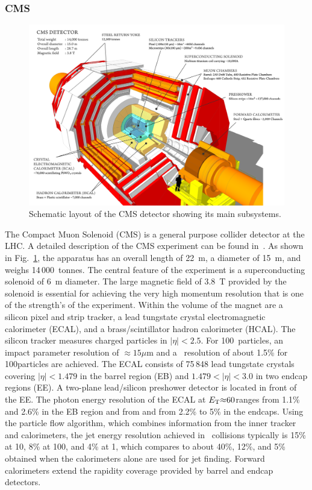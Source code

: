 \subsubsection{CMS}

\begin{figure}
\begin{center}
\includegraphics[height=0.49\textwidth]{introduction_figs/cms_120918_03.png}
\caption{Schematic layout of the CMS detector showing its main subsystems.}
\label{figs:CMSdet}
\end{center}
\end{figure}
The Compact Muon Solenoid (CMS) is a general purpose collider detector at the LHC. A detailed description of the CMS experiment
can be found in~\cite{Chatrchyan:2008zzk}.
As shown in Fig.~\ref{figs:CMSdet},  the apparatus has an overall length of 22~m, a diameter of 15~m, and weighs 14\,000~tonnes.
The central feature of the experiment is a superconducting solenoid
of 6~m diameter. The large magnetic field of 3.8~T provided by the solenoid is essential for achieving
the very high momentum resolution that is one of the strength's of the experiment.
Within the volume of the magnet are a silicon pixel and strip tracker, a lead tungstate crystal
electromagnetic calorimeter (ECAL), and a brass/scintillator hadron calorimeter (HCAL).
The silicon tracker measures charged particles in $|\eta|< 2.5$.
For 100\GeVc\ particles, an impact parameter resolution of $\approx 15\mu$m and a \pT\
resolution of about 1.5\% for 100\GeV [100\GeVc] particles are achieved.
The ECAL consists of 75\,848 lead tungstate crystals covering $|\eta|< 1.479 $ in the
barrel region (EB) and $1.479 < |\eta| < 3.0$ in two endcap regions (EE).
A two-plane lead/silicon preshower detector is located  in front of the EE.
The photon energy resolution of the ECAL at  $E_{\rm T} {\approx} 60$\GeV ranges from
 1.1\% and 2.6\% in the EB region and from and from 2.2\% to 5\% in the
endcaps.
Using the particle flow algorithm, which combines information from the inner tracker
and calorimeters, the jet energy resolution achieved in \pp\ collisions typically
is 15\% at 10\GeV, 8\% at 100\GeV, and 4\% at 1\TeV,
which compares to about 40\%, 12\%, and 5\% obtained when the calorimeters alone
are used for jet finding.
Forward calorimeters extend the rapidity coverage provided by barrel and endcap detectors.

